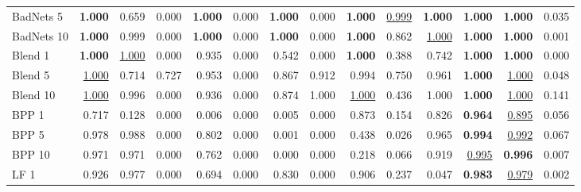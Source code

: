 \begin{table}[htbp]
\begin{adjustbox}{max width=\textwidth}
\begin{tabular}{lrrrrrrrrrrrrr}
BadNets 5 & \textbf{1.000} & 0.659 & \textcolor{black!45}{0.000} & \textbf{1.000} & \textcolor{black!45}{0.000} & \textbf{1.000} & \textcolor{black!45}{0.000} & \textbf{1.000} & \underline{0.999} & \textbf{1.000} & \textbf{1.000} & \textbf{1.000} & \textcolor{black!45}{0.035} \\
BadNets 10 & \textbf{1.000} & 0.999 & \textcolor{black!45}{0.000} & \textbf{1.000} & \textcolor{black!45}{0.000} & \textbf{1.000} & \textcolor{black!45}{0.000} & \textbf{1.000} & 0.862 & \underline{1.000} & \textbf{1.000} & \textbf{1.000} & \textcolor{black!45}{0.001} \\
Blend 1 & \textbf{1.000} & \underline{1.000} & \textcolor{black!45}{0.000} & 0.935 & \textcolor{black!45}{0.000} & 0.542 & \textcolor{black!45}{0.000} & \textbf{1.000} & \textcolor{black!45}{0.388} & 0.742 & \textbf{1.000} & \textbf{1.000} & \textcolor{black!45}{0.000} \\
Blend 5 & \underline{1.000} & 0.714 & 0.727 & 0.953 & \textcolor{black!45}{0.000} & 0.867 & 0.912 & 0.994 & 0.750 & 0.961 & \textbf{1.000} & \underline{1.000} & \textcolor{black!45}{0.048} \\
Blend 10 & \underline{1.000} & 0.996 & \textcolor{black!45}{0.000} & 0.936 & \textcolor{black!45}{0.000} & 0.874 & 1.000 & \underline{1.000} & \textcolor{black!45}{0.436} & 1.000 & \textbf{1.000} & \underline{1.000} & \textcolor{black!45}{0.141} \\
BPP 1 & 0.717 & \textcolor{black!45}{0.128} & \textcolor{black!45}{0.000} & \textcolor{black!45}{0.006} & \textcolor{black!45}{0.000} & \textcolor{black!45}{0.005} & \textcolor{black!45}{0.000} & 0.873 & \textcolor{black!45}{0.154} & 0.826 & \textbf{0.964} & \underline{0.895} & \textcolor{black!45}{0.056} \\
BPP 5 & 0.978 & 0.988 & \textcolor{black!45}{0.000} & 0.802 & \textcolor{black!45}{0.000} & \textcolor{black!45}{0.001} & \textcolor{black!45}{0.000} & \textcolor{black!45}{0.438} & \textcolor{black!45}{0.026} & 0.965 & \textbf{0.994} & \underline{0.992} & \textcolor{black!45}{0.067} \\
BPP 10 & 0.971 & 0.971 & \textcolor{black!45}{0.000} & 0.762 & \textcolor{black!45}{0.000} & \textcolor{black!45}{0.000} & \textcolor{black!45}{0.000} & \textcolor{black!45}{0.218} & \textcolor{black!45}{0.066} & 0.919 & \underline{0.995} & \textbf{0.996} & \textcolor{black!45}{0.007} \\
LF 1 & 0.926 & 0.977 & \textcolor{black!45}{0.000} & 0.694 & \textcolor{black!45}{0.000} & 0.830 & \textcolor{black!45}{0.000} & 0.906 & \textcolor{black!45}{0.237} & \textcolor{black!45}{0.047} & \textbf{0.983} & \underline{0.979} & \textcolor{black!45}{0.002} \\

\end{tabular}
\end{adjustbox}
\end{table}
